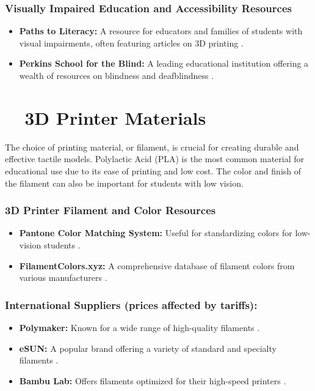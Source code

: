 \subsubsection{Visually Impaired Education and Accessibility Resources}
\begin{itemize}
	\item \textbf{Paths to Literacy:} A resource for educators and families of students with visual impairments, often featuring articles on 3D printing \supercite{PathsToLiteracy}.
	\item \textbf{Perkins School for the Blind:} A leading educational institution offering a wealth of resources on blindness and deafblindness \supercite{Perkins}.
\end{itemize}

\section{~~3D Printer Materials}\label{ch5:sec:materials}
The choice of printing material, or filament, is crucial for creating durable and effective tactile models. Polylactic Acid (PLA) is the most common material for educational use due to its ease of printing and low cost. The color and finish of the filament can also be important for students with low vision.\supercite{FilamentColors, Pantone}

\subsubsection{3D Printer Filament and Color Resources}
\begin{itemize}
	\item \textbf{Pantone Color Matching System:} Useful for standardizing colors for low-vision students \supercite{Pantone}.
	\item \textbf{FilamentColors.xyz:} A comprehensive database of filament colors from various manufacturers \supercite{FilamentColors}.
\end{itemize}

\subsubsection{International Suppliers (prices affected by tariffs):}
\begin{itemize}
	\item \textbf{Polymaker:} Known for a wide range of high-quality filaments \supercite{Polymaker}.
	\item \textbf{eSUN:} A popular brand offering a variety of standard and specialty filaments \supercite{eSUN}.
	\item \textbf{Bambu Lab:} Offers filaments optimized for their high-speed printers \supercite{BambuLab}.
\end{itemize}

